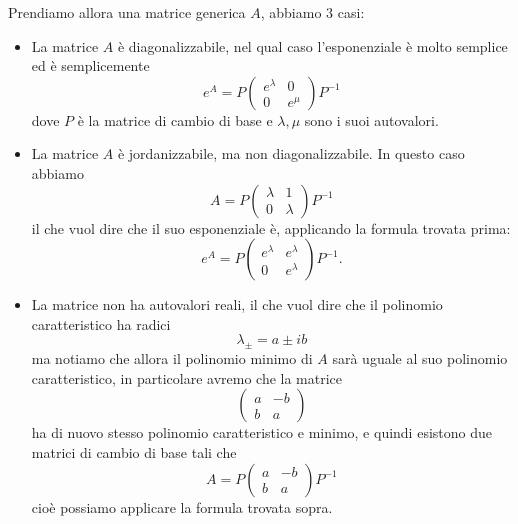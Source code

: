 \documentclass[11pt]{scrartcl}
\begin{document}
	Prendiamo allora una matrice generica $A$, abbiamo $3$ casi:
	\begin{itemize}
		\item La matrice $A$ è diagonalizzabile, nel qual caso l'esponenziale è molto semplice ed è semplicemente
		$$e^A=P\begin{pmatrix}
			e^\lambda & 0 \\
			0 & e^\mu
		\end{pmatrix}P^{-1}$$
		dove $P$ è la matrice di cambio di base e $\lambda,\mu$ sono i suoi autovalori.
		\item La matrice $A$ è jordanizzabile, ma non diagonalizzabile. In questo caso abbiamo
		$$A=P
		\begin{pmatrix}
			\lambda & 1 \\
			0 & \lambda
		\end{pmatrix}
		P^{-1}$$
		il che vuol dire che il suo esponenziale è, applicando la formula trovata prima:
		$$e^A=P\begin{pmatrix}
			e^\lambda & e^\lambda \\
			0 & e^\lambda
		\end{pmatrix}P^{-1}.$$
		\item La matrice non ha autovalori reali, il che vuol dire che il polinomio caratteristico ha radici
		$$\lambda_{\pm}=a\pm ib$$
		ma notiamo che allora il polinomio minimo di $A$ sarà uguale al suo polinomio caratteristico, in particolare avremo che la matrice 
		$$
		\begin{pmatrix}
			a & -b \\
			b & a
		\end{pmatrix}
		$$
		ha di nuovo stesso polinomio caratteristico e minimo, e quindi esistono due matrici di cambio di base tali che
		$$
		A=
		P
		\begin{pmatrix}
			a & -b \\
			b & a
		\end{pmatrix}
		P^{-1}
		$$ 
		cioè possiamo applicare la formula trovata sopra.
	\end{itemize}
\end{document}
